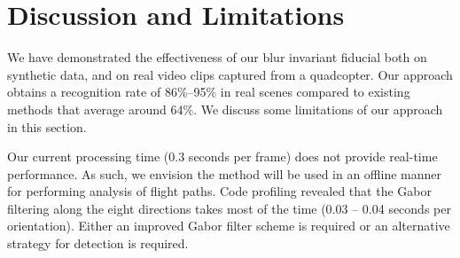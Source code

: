 \documentclass[10pt,twocolumn,letterpaper]{article}
\begin{document}

\section{Discussion and Limitations}\label{sec:discussion}

We have demonstrated the effectiveness of our blur invariant fiducial
both on synthetic data, and on real video clips captured from a quadcopter.
Our approach obtains a recognition rate of 86\%--95\% 
in real scenes compared to existing methods that average around
64\%.  We discuss some limitations of our approach in this section.

Our  current processing time (0.3 seconds per frame) does not provide
real-time performance.  As such, we envision the method will be used in an
offline manner for performing analysis of flight paths. Code profiling revealed
that the Gabor filtering along the eight directions takes most of the time
(0.03 -- 0.04 seconds per orientation).  Either an improved Gabor filter scheme
is required or an alternative strategy for detection is required.
\end{document}

